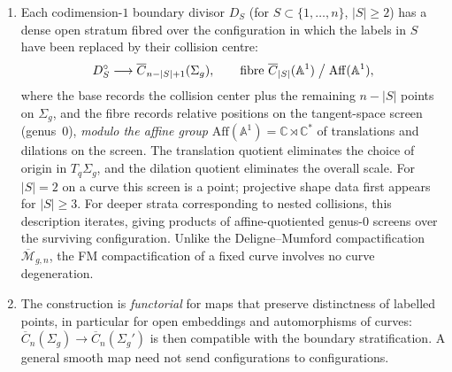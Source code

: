 \begin{theorem}
\begin{enumerate}
\item Each codimension-$1$ boundary divisor $D_S$ (for
$S \subset \{1,\ldots,n\}$, $|S| \geq 2$) has a dense open stratum
fibred over the configuration in which the labels in $S$ have been
replaced by their collision centre:
\[
D_S^\circ
\longrightarrow
\overline{C}_{n-|S|+1}(\Sigma_g),
\qquad
\text{fibre }
\overline{C}_{|S|}(\mathbb{A}^1)\bigm/
\mathrm{Aff}(\mathbb{A}^1),
\]
where the base records the collision center plus the remaining
$n-|S|$ points on $\Sigma_g$, and the fibre records relative positions
on the tangent-space screen (genus~$0$), \emph{modulo the affine group}
$\mathrm{Aff}(\mathbb{A}^1) = \mathbb{C} \rtimes \mathbb{C}^*$
of translations and dilations on the screen. The translation quotient
eliminates the choice of origin in $T_q\Sigma_g$, and the dilation
quotient eliminates the overall scale. For $|S|=2$ on a curve this
screen is a point; projective shape data first appears for
$|S|\geq3$. For deeper strata corresponding to nested collisions, this
description iterates, giving products of affine-quotiented genus-$0$
screens over the surviving configuration. Unlike the
Deligne--Mumford compactification $\overline{\mathcal{M}}_{g,n}$, the
FM compactification of a fixed curve involves no curve degeneration.

\item The construction is \emph{functorial} for maps that preserve
distinctness of labelled points, in particular for open embeddings and
automorphisms of curves:
$\overline{C}_n(\Sigma_g) \to \overline{C}_n(\Sigma_g')$ is then
compatible with the boundary stratification. A general smooth map need
not send configurations to configurations.
\end{enumerate}
\end{theorem}

